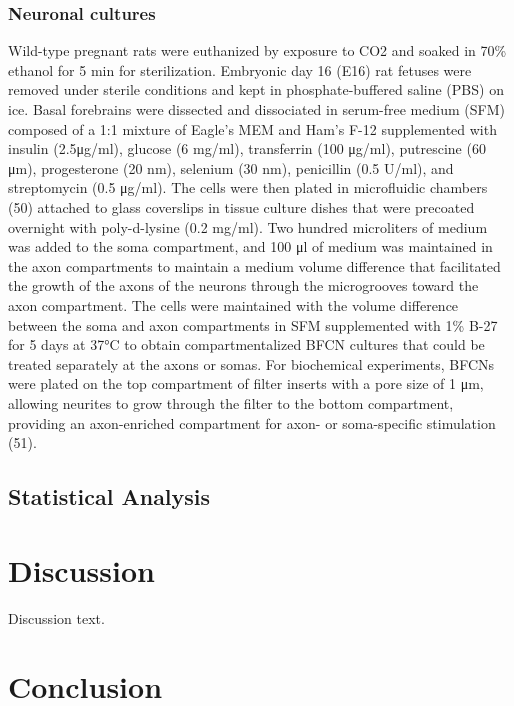 \documentclass[
  letterpaper,
  DIV=11,
  numbers=noendperiod]{scrreprt}
\begin{document}
\subsection{Neuronal cultures}\label{neuronal-cultures}

Wild-type pregnant rats were euthanized by exposure to CO2 and soaked in
70\% ethanol for 5 min for sterilization. Embryonic day 16 (E16) rat
fetuses were removed under sterile conditions and kept in
phosphate-buffered saline (PBS) on ice. Basal forebrains were dissected
and dissociated in serum-free medium (SFM) composed of a 1:1 mixture of
Eagle's MEM and Ham's F-12 supplemented with insulin (2.5μg/ml), glucose
(6 mg/ml), transferrin (100 μg/ml), putrescine (60 μm), progesterone (20
nm), selenium (30 nm), penicillin (0.5 U/ml), and streptomycin (0.5
μg/ml). The cells were then plated in microfluidic chambers (50)
attached to glass coverslips in tissue culture dishes that were
precoated overnight with poly-d-lysine (0.2 mg/ml). Two hundred
microliters of medium was added to the soma compartment, and 100 μl of
medium was maintained in the axon compartments to maintain a medium
volume difference that facilitated the growth of the axons of the
neurons through the microgrooves toward the axon compartment. The cells
were maintained with the volume difference between the soma and axon
compartments in SFM supplemented with 1\% B-27 for 5 days at 37°C to
obtain compartmentalized BFCN cultures that could be treated separately
at the axons or somas. For biochemical experiments, BFCNs were plated on
the top compartment of filter inserts with a pore size of 1 μm, allowing
neurites to grow through the filter to the bottom compartment, providing
an axon-enriched compartment for axon- or soma-specific stimulation
(51).

\section{Statistical Analysis}\label{statistical-analysis}


\chapter{Discussion}\label{discussion}

Discussion text.


\chapter{Conclusion}\label{conclusion}
\end{document}

